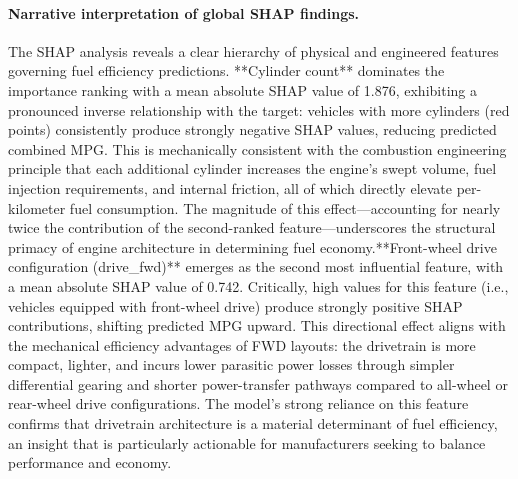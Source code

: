 \paragraph{Narrative interpretation of global SHAP findings.}
The SHAP analysis reveals a clear hierarchy of physical and engineered features governing fuel efficiency predictions. **Cylinder count** dominates the importance ranking with a mean absolute SHAP value of 1.876, exhibiting a pronounced inverse relationship with the target: vehicles with more cylinders (red points) consistently produce strongly negative SHAP values, reducing predicted combined MPG. This is mechanically consistent with the combustion engineering principle that each additional cylinder increases the engine's swept volume, fuel injection requirements, and internal friction, all of which directly elevate per-kilometer fuel consumption. The magnitude of this effect—accounting for nearly twice the contribution of the second-ranked feature—underscores the structural primacy of engine architecture in determining fuel economy.**Front-wheel drive configuration (drive\_fwd)** emerges as the second most influential feature, with a mean absolute SHAP value of 0.742. Critically, high values for this feature (i.e., vehicles equipped with front-wheel drive) produce strongly positive SHAP contributions, shifting predicted MPG upward. This directional effect aligns with the mechanical efficiency advantages of FWD layouts: the drivetrain is more compact, lighter, and incurs lower parasitic power losses through simpler differential gearing and shorter power-transfer pathways compared to all-wheel or rear-wheel drive configurations. The model's strong reliance on this feature confirms that drivetrain architecture is a material determinant of fuel efficiency, an insight that is particularly actionable for manufacturers seeking to balance performance and economy.
